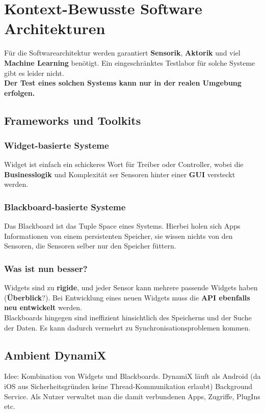 \documentclass[a4paper]{article}
\begin{document}
\section{Kontext-Bewusste Software Architekturen}
Für die Softwarearchitektur werden garantiert \textbf{Sensorik}, \textbf{Aktorik} und viel \textbf{Machine Learning} benötigt. Ein eingeschränktes Testlabor für solche Systeme gibt es leider nicht.\\

\textbf{Der Test eines solchen Systems kann nur in der realen Umgebung erfolgen.}
\subsection{Frameworks und Toolkits}
\subsubsection{Widget-basierte Systeme}
Widget ist einfach ein schickeres Wort für Treiber oder Controller, wobei die \textbf{Businesslogik} und Komplexität ser Sensoren hinter einer \textbf{GUI} versteckt werden.
\subsubsection{Blackboard-basierte Systeme}
Das Blackboard ist das Tuple Space eines Systems. Hierbei holen sich Apps Informationen von einem persistenten Speicher, sie wissen nichts von den Sensoren, die Sensoren selber nur den Speicher füttern.
\subsubsection{Was ist nun besser?}
Widgets sind zu \textbf{rigide}, und jeder Sensor kann mehrere passende Widgets haben (\textbf{Überblick}?). Bei Entwicklung eines neuen Widgets muss die \textbf{API ebenfalls neu entwickelt} werden. \\
Blackboards hingegen sind ineffizient hinsichtlich des Speicherns und der Suche der Daten. Es kann dadurch vermehrt zu Synchronisationsproblemen kommen.
\subsection{Ambient DynamiX}
Idee: Kombination von Widgets und Blackboards. DynamiX läuft als Android (da iOS aus Sicherheitsgründen keine Thread-Kommunikation erlaubt) Background Service. Als Nutzer verwaltet man die damit verbundenen Apps, Zugriffe, PlugIns etc.
\end{document}
